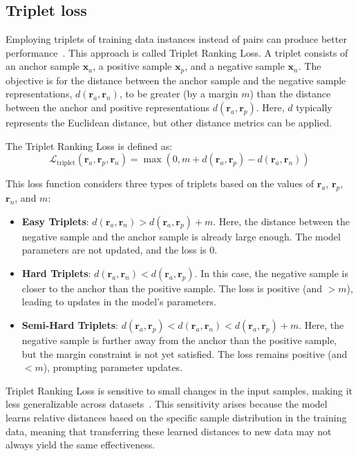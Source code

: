 \documentclass[sn-mathphys-num]{sn-jnl}%
\renewcommand\vec{\mathbf}
\begin{document}
\subsection{Triplet loss}\label{sec:triplet-loss-ranking}

Employing triplets of training data instances instead of pairs can produce better performance~\cite{hoffer2015deep,wang2014learning,chechik2010large}. This approach is called Triplet Ranking Loss. A triplet consists of an anchor sample $\vec{x}_a$, a positive sample $\vec{x}_p$, and a negative sample $\vec{x}_n$. The objective is for the distance between the anchor sample and the negative sample representations, $d(\vec{r}_a, \vec{r}_n)$, to be greater (by a margin $m$) than the distance between the anchor and positive representations $d(\vec{r}_a, \vec{r}_p)$. Here, $d$ typically represents the Euclidean distance, but other distance metrics can be applied.

The Triplet Ranking Loss is defined as:
\begin{equation}
    \mathcal{L}_{\text{triplet}}(\vec{r}_a, \vec{r}_p, \vec{r}_n) = \max(0, m + d(\vec{r}_a, \vec{r}_p) - d(\vec{r}_a, \vec{r}_n))        
\end{equation}

This loss function considers three types of triplets based on the values of $\vec{r}_a$, $\vec{r}_p$, $\vec{r}_n$, and $m$:
\begin{itemize}
    \item \textbf{Easy Triplets}: $d(\vec{r}_a, \vec{r}_n) > d(\vec{r}_a, \vec{r}_p) + m$. Here, the distance between the negative sample and the anchor sample is already large enough. The model parameters are not updated, and the loss is $0$.
    \item \textbf{Hard Triplets}: $d(\vec{r}_a, \vec{r}_n) < d(\vec{r}_a, \vec{r}_p)$. In this case, the negative sample is closer to the anchor than the positive sample. The loss is positive (and $> m$), leading to updates in the model's parameters.
    \item \textbf{Semi-Hard Triplets}: $d(\vec{r}_a, \vec{r}_p) < d(\vec{r}_a, \vec{r}_n) < d(\vec{r}_a, \vec{r}_p) + m$. Here, the negative sample is further away from the anchor than the positive sample, but the margin constraint is not yet satisfied. The loss remains positive (and $< m$), prompting parameter updates.
\end{itemize}

Triplet Ranking Loss is sensitive to small changes in the input samples, making it less generalizable across datasets~\cite{koch2015siamese}. This sensitivity arises because the model learns relative distances based on the specific sample distribution in the training data, meaning that transferring these learned distances to new data may not always yield the same effectiveness.
\end{document}
